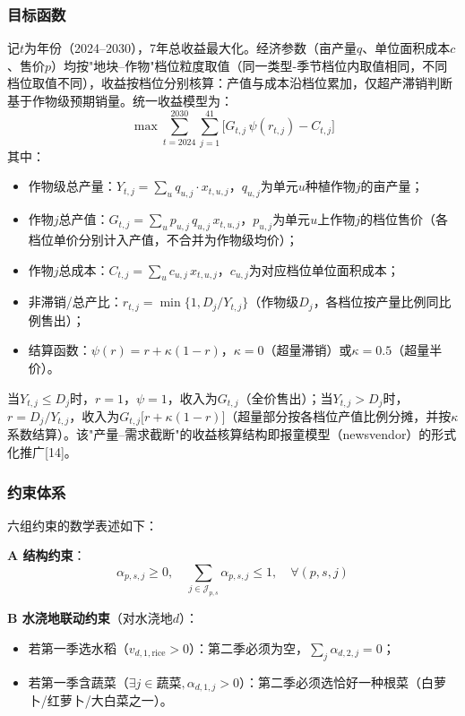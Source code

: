 \documentclass[12pt,a4paper]{article}
\begin{document}
\subsubsection{目标函数}

记$t$为年份（2024--2030），7年总收益最大化。经济参数（亩产量$q$、单位面积成本$c$、售价$p$）均按"地块--作物"档位粒度取值（同一类型-季节档位内取值相同，不同档位取值不同），收益按档位分别核算：产值与成本沿档位累加，仅超产滞销判断基于作物级预期销量。统一收益模型为：
\begin{equation}
\max\sum_{t=2024}^{2030}\sum_{j=1}^{41}\Big[G_{t,j}\,\psi(r_{t,j})-C_{t,j}\Big]
\label{eq:obj}
\end{equation}
其中：
\begin{itemize}
  \item 作物级总产量：$Y_{t,j}=\sum_{u}q_{u,j}\cdot x_{t,u,j}$，$q_{u,j}$为单元$u$种植作物$j$的亩产量；
  \item 作物$j$总产值：$G_{t,j}=\sum_{u}p_{u,j}\,q_{u,j}\,x_{t,u,j}$，$p_{u,j}$为单元$u$上作物$j$的档位售价（各档位单价分别计入产值，不合并为作物级均价）；
  \item 作物$j$总成本：$C_{t,j}=\sum_{u}c_{u,j}\,x_{t,u,j}$，$c_{u,j}$为对应档位单位面积成本；
  \item 非滞销/总产比：$r_{t,j}=\min\{1,D_j/Y_{t,j}\}$（作物级$D_j$，各档位按产量比例同比例售出）；
  \item 结算函数：$\psi(r)=r+\kappa(1-r)$，$\kappa=0$（超量滞销）或$\kappa=0.5$（超量半价）。
\end{itemize}

当$Y_{t,j}\le D_j$时，$r=1$，$\psi=1$，收入为$G_{t,j}$（全价售出）；当$Y_{t,j}>D_j$时，$r=D_j/Y_{t,j}$，收入为$G_{t,j}\big[r+\kappa(1-r)\big]$（超量部分按各档位产值比例分摊，并按$\kappa$系数结算）。该"产量--需求截断"的收益核算结构即报童模型（newsvendor）的形式化推广[14]。

\subsubsection{约束体系}

六组约束的数学表述如下：

\textbf{A 结构约束}：
\begin{equation}
\alpha_{p,s,j}\ge0,\quad \sum_{j\in\mathcal{J}_{p,s}}\alpha_{p,s,j}\le1,\quad \forall(p,s,j)
\label{eq:struct}
\end{equation}

\textbf{B 水浇地联动约束}（对水浇地$d$）：
\begin{itemize}
  \item 若第一季选水稻（$v_{d,1,\text{rice}}>0$）：第二季必须为空，$\sum_j\alpha_{d,2,j}=0$；
  \item 若第一季含蔬菜（$\exists j\in\text{蔬菜},\alpha_{d,1,j}>0$）：第二季必须选恰好一种根菜（白萝卜/红萝卜/大白菜之一）。
\end{itemize}
\end{document}
